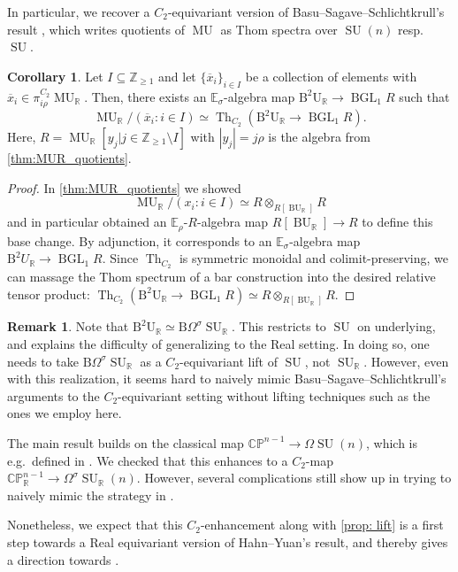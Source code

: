\documentclass[a4paper, 10pt]{article}
\newcommand{\B}{\mathrm B}
\newcommand{\E}{\mathbb E}  %
\newcommand{\R}{\mathbb R}
\newcommand{\Z}{\mathbb{Z}}
\newcommand{\MU}{\operatorname{MU}}
\newcommand{\MUR}{{\MU_{\mathbb{R}}}}
\newcommand{\CPR}{\mathbb{CP}_{\mathbb{R}}}
\newcommand{\BU}{\operatorname{BU}}
\newcommand{\BGL}{\operatorname{BGL}}
\newcommand{\Th}{\operatorname{Th}}
\newcommand{\SU}{\operatorname{SU}}
\newcommand{\ol}{\overline}
\theoremstyle{definition}
\newtheorem{remark}[remark]{Remark}
\newtheorem{corollary}[corollary]{Corollary}
\begin{document}
In particular, we recover a $C_2$-equivariant version of Basu--Sagave--Schlichtkrull's result \cite[Theorem 5.6]{Basu_2017}, which writes quotients of $\MU$ as Thom spectra over $\SU(n)$ resp.~$\SU$.

\begin{corollary} \label{corollary: Real BSS}
    Let \(I\subseteq \mathbb{Z}_{\geq 1}\) and let \(\{\ol{x}_i\}_{i\in I}\) be a collection of elements with \(\ol{x}_i \in \pi^{C_2}_{i\rho}\MUR\). Then, there exists an $\E_{\sigma}$-algebra map $\mathrm{B}^2 \mathrm{U}_{\R} \to \BGL_1 R$ such that
    \[ \MU_{\R}/(\ol{x}_i : i \in I) \simeq \Th_{C_2}(\mathrm{B}^2 \mathrm{U}_{\R} \to \BGL_1 R). \]
    Here, $R = \MUR[y_j\vert j\in \Z_{\geq 1}\setminus I]$ with \(|y_j| = j\rho\) is the algebra from \cref{thm:MUR_quotients}.
\end{corollary}

\begin{proof}
    In \cref{thm:MUR_quotients} we showed 
    \[ \MU_{\R}/(x_i : i \in I) \simeq R\otimes_{R[\BU_{\R}]} R \]
    and in particular obtained an $\E_{\rho}$-$R$-algebra map $R[\BU_{\R}] \to R$ to define this base change. By adjunction, it corresponds to an $\E_{\sigma}$-algebra map $\B^2 U_{\R} \to \BGL_1 R$. Since $\Th_{C_2}$ is symmetric monoidal and colimit-preserving, we can massage the Thom spectrum of a bar construction into the desired relative tensor product: $\Th_{C_2}(\mathrm{B}^2 \mathrm{U}_{\R} \to \BGL_1 R) \simeq R\otimes_{R[\BU_{\R}]} R$.
\end{proof}


\begin{remark} \label{remark: BSS hard}
    Note that $\mathrm{B^2} \mathrm{U}_{\R} \simeq \mathrm{B} \Omega^{\sigma} \SU_{\R}$. This restricts to $\SU$ on underlying, and explains the difficulty of generalizing \cite[Theorem 5.6]{Basu_2017} to the Real setting. In doing so, one needs to take $\mathrm{B}\Omega^{\sigma} \SU_{\R}$ as a $C_2$-equivariant lift of $\SU$, not $\SU_{\R}$. However, even with this realization, it seems hard to naively mimic Basu--Sagave--Schlichtkrull's arguments to the $C_2$-equivariant setting without lifting techniques such as the ones we employ here.
    
    The main result \cite[Theorem 5.6]{Basu_2017} builds on the classical map $\mathbb{CP}^{n-1} \to \Omega \SU(n)$, which is e.g.~defined in \cite[Introduction]{HahnYuan}. We checked that this enhances to a $C_2$-map $\CPR^{n-1} \to \Omega^{\sigma} \SU_{\R}(n)$. However, several complications still show up in trying to naively mimic the strategy in \cite{Basu_2017}.

    Nonetheless, we expect that this $C_2$-enhancement along with \cref{prop: lift} is a first step towards a Real equivariant version of Hahn--Yuan's result, and thereby gives a direction towards \cite[Question 4]{HahnYuan}.
\end{remark}
\end{document}
